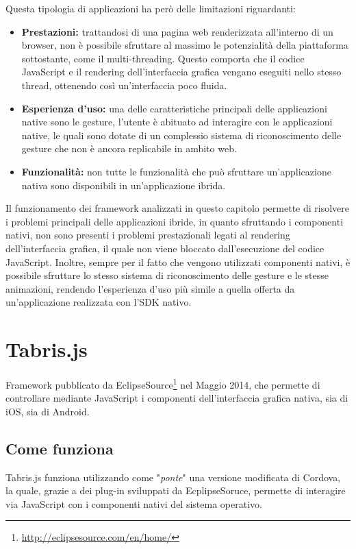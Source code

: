 Questa tipologia di applicazioni ha però delle limitazioni riguardanti:
\begin{itemize}
\item \textbf{Prestazioni:} trattandosi di una pagina web renderizzata all'interno di un browser, non è possibile sfruttare al massimo le potenzialità della piattaforma sottostante, come il multi-threading. Questo comporta che il codice JavaScript e il rendering dell'interfaccia grafica vengano eseguiti nello stesso thread, ottenendo così un'interfaccia poco fluida.
\item \textbf{Esperienza d'uso:} una delle caratteristiche principali delle applicazioni native sono le \gls{gesture}, l'utente è abituato ad interagire con le applicazioni native, le quali sono dotate di un complessio sistema di riconoscimento delle gesture che non è ancora replicabile in ambito web.
\item \textbf{Funzionalità:} non tutte le funzionalità che può sfruttare un'applicazione nativa sono disponibili in un'applicazione ibrida.
\end{itemize}

Il funzionamento dei framework analizzati in questo capitolo permette di risolvere i problemi principali delle applicazioni ibride, in quanto sfruttando i componenti nativi, non sono presenti i problemi prestazionali legati al rendering dell'interfaccia grafica, il quale non viene bloccato dall'esecuzione del codice JavaScript. Inoltre, sempre per il fatto che  vengono utilizzati componenti nativi, è possibile sfruttare lo stesso sistema di riconoscimento delle gesture e le stesse animazioni, rendendo l'esperienza d'uso più simile a quella offerta da un'applicazione realizzata con l'SDK nativo.

\section{Tabris.js}

Framework pubblicato da EclipseSource\footnote{\url{http://eclipsesource.com/en/home/}} nel Maggio 2014, che permette di controllare mediante JavaScript i componenti dell'interfaccia grafica nativa, sia di iOS, sia di Android.

\subsection{Come funziona}
Tabris.js funziona utilizzando come "\textit{ponte}" una versione modificata di Cordova, la quale, grazie a dei plug-in sviluppati da EcplipseSoruce, permette di interagire via JavaScript con i componenti nativi del sistema operativo.

